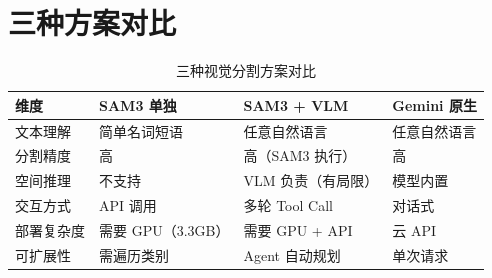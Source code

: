 \section{三种方案对比}

\begin{table}[H]
\centering
\begin{tabular}{p{3cm}p{3.5cm}p{3.5cm}p{3.5cm}}
\toprule
\textbf{维度} & \textbf{SAM3 单独} & \textbf{SAM3 + VLM} & \textbf{Gemini 原生} \\
\midrule
文本理解 & 简单名词短语 & 任意自然语言 & 任意自然语言 \\
分割精度 & 高 & 高（SAM3 执行） & 高 \\
空间推理 & 不支持 & VLM 负责（有局限） & 模型内置 \\
交互方式 & API 调用 & 多轮 Tool Call & 对话式 \\
部署复杂度 & 需要 GPU（3.3GB） & 需要 GPU + API & 云 API \\
可扩展性 & 需遍历类别 & Agent 自动规划 & 单次请求 \\
\bottomrule
\end{tabular}
\caption{三种视觉分割方案对比}
\end{table}


